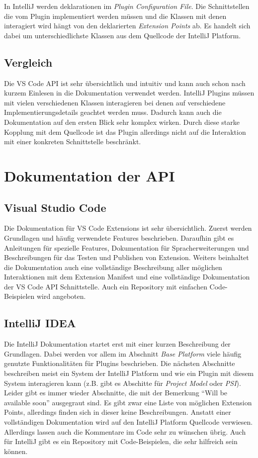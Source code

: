 In IntelliJ werden deklarationen im \emph{Plugin Configuration File}.
Die Schnittstellen die vom Plugin implementiert werden müssen und
die Klassen mit denen interagiert wird hängt von den deklarierten
\emph{Extension Points} ab. Es handelt sich dabei um unterschiedlichste
Klassen aus dem Quellcode der IntelliJ Platform.

\subsection{Vergleich}

Die VS Code API ist sehr übersichtlich und intuitiv und kann auch
schon nach kurzem Einlesen in die Dokumentation verwendet werden.
IntelliJ Plugins müssen mit vielen verschiedenen Klassen interagieren
bei denen auf verschiedene Implementierungsdetails geachtet werden muss.
Dadurch kann auch die Dokumentation auf den ersten Blick sehr komplex
wirken. Durch diese starke Kopplung mit dem Quellcode ist das Plugin
allerdings nicht auf die Interaktion mit einer konkreten Schnittstelle beschränkt.


\section{Dokumentation der API}
\label{sec:Vergleich_Dokumentation}

\subsection{Visual Studio Code}

Die Dokumentation für VS Code Extensions ist sehr übersichtlich.
Zuerst werden Grundlagen und häufig verwendete Features beschrieben.
Daraufhin gibt es Anleitungen für spezielle Features,
Dokumentation für Spracherweiterungen und Beschreibungen
für das Testen und Publishen von Extension.
Weiters beinhaltet die Dokumentation auch eine vollständige Beschreibung
aller möglichen Interaktionen mit dem Extension Manifest
und eine vollständige Dokumentation der VS Code API Schnittstelle.
Auch ein Repository mit einfachen Code-Beispielen wird angeboten.

\subsection{IntelliJ IDEA}

Die IntelliJ Dokumentation startet erst mit einer kurzen 
Beschreibung der Grundlagen. Dabei werden vor allem im
Abschnitt \emph{Base Platform} viele häufig genutzte Funktionalitäten
für Plugins beschrieben. Die nächsten Abschnitte beschreiben
meist ein System der IntelliJ Platform und wie ein Plugin mit diesem
System interagieren kann (z.B. gibt es Abschitte für \emph{Project Model}
oder \emph{PSI}). Leider gibt es immer wieder Abschnitte, die mit der 
Bemerkung \enquote{Will be available soon} ausgegraut sind.
Es gibt zwar eine Liste von möglichen Extension Points, allerdings
finden sich in dieser keine Beschreibungen. Anstatt einer vollständigen
Dokumentation wird auf den IntelliJ Platform Quellcode verwiesen.
Allerdings lassen auch die Kommentare im Code sehr zu wünschen übrig.
Auch für IntelliJ gibt es ein Repository mit Code-Beispielen, die sehr
hilfreich sein können.

